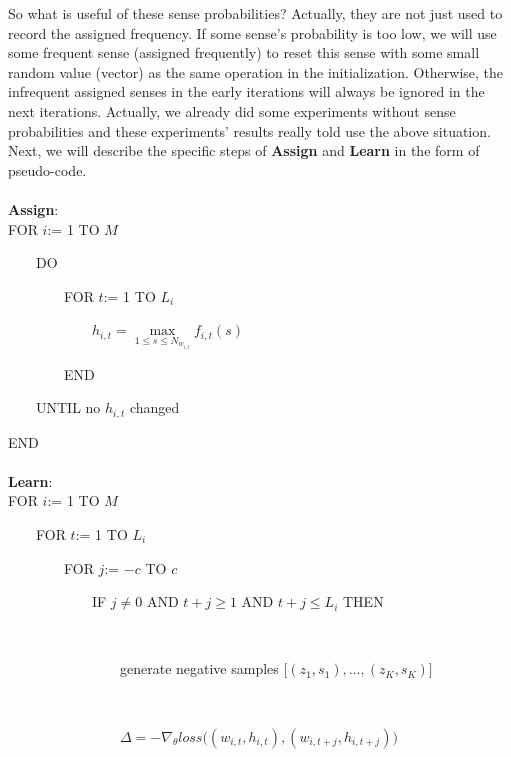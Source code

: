So what is useful of these sense probabilities? Actually, they are not just used to record the assigned frequency. If some sense's probability is too low, we will use some frequent sense (assigned frequently) to reset this sense with some small random value (vector) as the same operation in the initialization. Otherwise, the infrequent assigned senses in the early iterations will always be ignored in the next iterations. Actually, we already did some experiments without sense probabilities and these experiments' results really told use the above situation. \\


Next, we will describe the specific steps of \textbf{Assign} and \textbf{Learn} in the form of pseudo-code.

\paragraph{} \textbf{Assign}:\\

FOR $i$:= 1 TO $M$

\ \ \ \ DO

\ \ \ \ \ \ \ \ FOR $t$:= 1 TO $L_i$

\ \ \ \ \ \ \ \ \ \ \ \ $h_{i,t} = \max\limits_{1\leq s\leq N_{w_{i,t}}} f_{i,t}(s)$

\ \ \ \ \ \ \ \ END

\ \ \ \ UNTIL no $h_{i,t}$ changed

END

\paragraph{} \textbf{Learn}:\\

FOR $i$:= 1 TO $M$

\ \ \ \ FOR $t$:= 1 TO $L_i$

\ \ \ \ \ \ \ \ FOR $j$:= $-c$ TO $c$

\ \ \ \ \ \ \ \ \ \ \ \ IF $j\neq 0$ AND $t+j\geq1$ AND $t+j\leq L_i$ THEN

\ \ \ \ \ \ \ \ \ \ \ \ \ \ \ \

\ \ \ \ \ \ \ \ \ \ \ \ \ \ \ \ generate negative samples $\big [(z_1,s_1),\ldots,(z_K,s_K)\big ]$

\ \ \ \ \ \ \ \ \ \ \ \ \ \ \ \

\ \ \ \ \ \ \ \ \ \ \ \ \ \ \ \ $\Delta = -\nabla_\theta loss\big ( (w_{i,t},h_{i,t}),(w_{i,t+j},h_{i,t+j})\big )$

